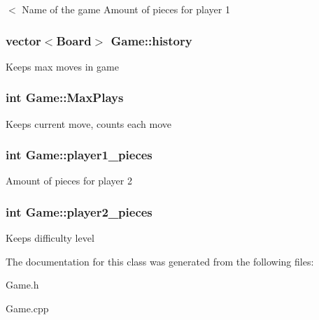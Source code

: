 $<$ Name of the game Amount of pieces for player 1 \hypertarget{class_game_a7c0dd74fa2e5c366638596b7e82428f1}{
\subsubsection[{history}]{\setlength{\rightskip}{0pt plus 5cm}vector$<${\bf Board}$>$ Game\-::history\hspace{0.3cm}{\ttfamily [protected]}}}\label{class_game_a7c0dd74fa2e5c366638596b7e82428f1}
Keeps max moves in game \hypertarget{class_game_a53cb9be6604469db6b3abac24c5a2ab6}{
\subsubsection[{Max\-Plays}]{\setlength{\rightskip}{0pt plus 5cm}int Game\-::\-Max\-Plays\hspace{0.3cm}{\ttfamily [protected]}}}\label{class_game_a53cb9be6604469db6b3abac24c5a2ab6}
Keeps current move, counts each move \hypertarget{class_game_aea2c7f8bdb891f32026750c81f6eac16}{
\subsubsection[{player1\-\_\-pieces}]{\setlength{\rightskip}{0pt plus 5cm}int Game\-::player1\-\_\-pieces\hspace{0.3cm}{\ttfamily [protected]}}}\label{class_game_aea2c7f8bdb891f32026750c81f6eac16}
Amount of pieces for player 2 \hypertarget{class_game_a2b82ab082220d93bab2d7d1d181ad639}{
\subsubsection[{player2\-\_\-pieces}]{\setlength{\rightskip}{0pt plus 5cm}int Game\-::player2\-\_\-pieces\hspace{0.3cm}{\ttfamily [protected]}}}\label{class_game_a2b82ab082220d93bab2d7d1d181ad639}
Keeps difficulty level 

The documentation for this class was generated from the following files\-:\begin{DoxyCompactItemize}
\item 
Game.\-h\item 
Game.\-cpp\end{DoxyCompactItemize}
